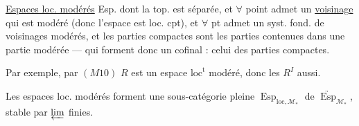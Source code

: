 \uline{Espaces loc. modérés} Esp.   dont la top. est  séparée, et $\forall$ point admet un \uline{voisinage} qui est  modéré (donc l'espace est loc. cpt), et $\forall$ pt admet un syst. fond. de voisinages modérés, et les parties compactes sont les parties contenues dans une partie modérée --- qui forment donc un  cofinal : celui des parties compactes.

Par exemple, par $(M10)$ $R$ est un espace $\mathrm{loc}^{\mathrm t}$ modéré, donc les $R^I$ aussi.

Les espaces loc. modérés  forment une sous-catégorie pleine $\operatorname{Esp}_{\mathrm{loc},\mathcal M_*}$ de $\underrightarrow{\operatorname{Esp}}_{\mathcal M_*}$, stable par $\varprojlim$ finies.

